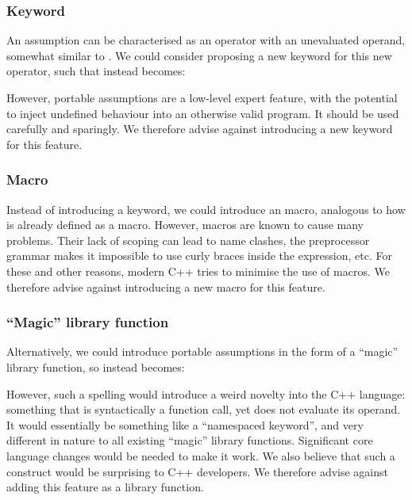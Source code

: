 \subsubsection{Keyword}

An assumption can be characterised as an operator with an unevaluated operand, somewhat similar to . We could consider proposing a new keyword for this new operator, such that  instead becomes:

\forceindent
{}

However, portable assumptions are a low-level expert feature, with the potential to inject undefined behaviour into an otherwise valid program. It should be used carefully and sparingly. We therefore advise against introducing a new keyword for this feature.


\subsubsection{Macro}

Instead of introducing a keyword, we could introduce an  macro, analogous to how  is already defined as a macro. However, macros are known to cause many problems. Their lack of scoping can lead to name clashes, the preprocessor grammar makes it impossible to use curly braces inside the expression, etc. For these and other reasons, modern C++ tries to minimise the use of macros. We therefore advise against introducing a new macro for this feature.

\subsubsection{``Magic'' library function}

Alternatively, we could introduce portable assumptions in the form of a ``magic'' library function, so  instead becomes:

\forceindent

However, such a spelling would introduce a weird novelty into the C++ language: something that is syntactically a function call, yet does not evaluate its operand. It would essentially be something like a ``namespaced keyword'', and very different in nature to all existing ``magic'' library functions. Significant core language changes would be needed to make it work. We also believe that such a construct would be surprising to C++ developers. We therefore advise against adding this feature as a library function.

